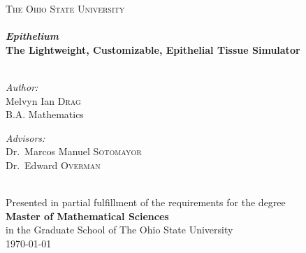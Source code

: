 \begin{titlepage}
\begin{center}

\textsc{\LARGE The Ohio State University}\\[1.5cm]

\HRule \\[0.4cm]
{ \huge \bfseries \emph{Epithelium} \\[0.2cm] \small The Lightweight, Customizable, Epithelial Tissue Simulator \\[0.4cm] }
\HRuleBig \\[1.5cm]

\noindent
\begin{minipage}{0.4\textwidth}
\begin{flushleft} \large
\emph{Author:}\\
Melvyn Ian \textsc{Drag}\\
B.A. Mathematics
\end{flushleft}
\end{minipage}%
\begin{minipage}{0.4\textwidth}
\begin{flushright} \large
\emph{Advisors:} \\
Dr.~Marcos Manuel \textsc{Sotomayor}\\
Dr.~Edward \textsc{Overman}
\end{flushright}
\end{minipage}
\\[4cm]
\vspace{4cm}
Presented in partial fulfillment of the requirements for the degree\\
{\bf{Master of Mathematical Sciences}}\\ in the Graduate School of The Ohio State University \\[1cm]
{\large \today}

\end{center}
\end{titlepage}
